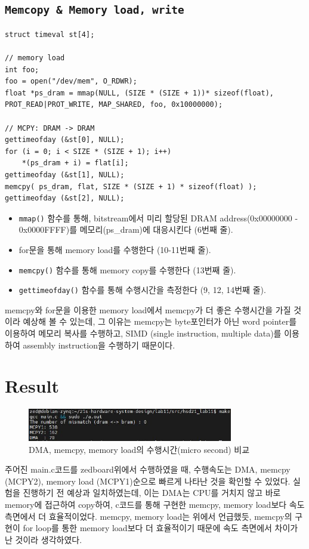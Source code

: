 \documentclass{article}
\begin{document}
\newpage
\subsection*{\texttt{Memcopy \& Memory load, write}}
\begin{lstlisting}[style={c-style}]
struct timeval st[4];

// memory load
int foo;
foo = open("/dev/mem", O_RDWR);
float *ps_dram = mmap(NULL, (SIZE * (SIZE + 1))* sizeof(float), PROT_READ|PROT_WRITE, MAP_SHARED, foo, 0x10000000);

// MCPY: DRAM -> DRAM
gettimeofday (&st[0], NULL);
for (i = 0; i < SIZE * (SIZE + 1); i++)
    *(ps_dram + i) = flat[i];
gettimeofday (&st[1], NULL);
memcpy( ps_dram, flat, SIZE * (SIZE + 1) * sizeof(float) );
gettimeofday (&st[2], NULL);
\end{lstlisting}
\begin{itemize}
    \item  \texttt{mmap()} 함수를 통해, bitstream에서 미리 할당된 DRAM address(0x00000000 - 0x0000FFFF)를 메모리(ps\_dram)에 대응시킨다 (6번째 줄).
    \item for문을 통해 memory load를 수행한다 (10-11번째 줄).
    \item  \texttt{memcpy()} 함수를 통해 memory copy를 수행한다 (13번째 줄).
    \item  \texttt{gettimeofday()} 함수를 통해 수행시간을 측정한다 (9, 12, 14번째 줄).
\end{itemize}
memcpy와 for문을 이용한 memory load에서 memcpy가 더 좋은 수행시간을 가질 것이라 예상해 볼 수 있는데, 그 이유는 memcpy는 byte포인터가 아닌 word pointer를 이용하여 메모리 복사를 수행하고, SIMD (single instruction, multiple data)를 이용하여 assembly instruction을 수행하기 때문이다.

\section{Result}
\begin{figure}[htb!]
	\centering
	\includegraphics[width=0.8\textwidth]{fig/make1.jpg}
\caption{DMA, memcpy, memory load의 수행시간(micro second) 비교}
\label{fig6}
\end{figure}

주어진 main.c코드를 zedboard위에서 수행하였을 때, 수행속도는 DMA, memcpy (MCPY2), memory load (MCPY1)순으로 빠르게 나타난 것을 확인할 수 있었다. 실험을 진행하기 전 예상과 일치하였는데, 이는 DMA는 CPU를 거치지 않고 바로 memory에 접근하여 copy하여, c코드를 통해 구현한 memcpy, memory load보다 속도 측면에서 더 효율적이었다.
memcpy, memory load는 위에서 언급했듯, memcpy의 구현이 for loop를 통한 memory load보다 더 효율적이기 때문에 속도 측면에서 차이가 난 것이라 생각하였다.
\end{document}
